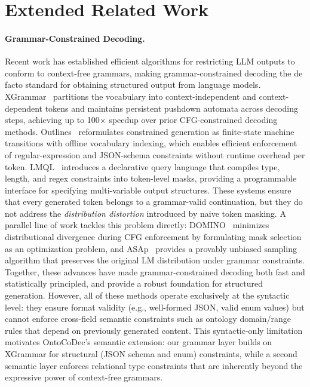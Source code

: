 \section{Extended Related Work}
\label{app:related_work}

\paragraph{Grammar-Constrained Decoding.}
Recent work has established efficient algorithms for restricting LLM outputs to conform to context-free grammars, making grammar-constrained decoding the de facto standard for obtaining structured output from language models.
XGrammar~\cite{dong2025xgrammar} partitions the vocabulary into context-independent and context-dependent tokens and maintains persistent pushdown automata across decoding steps, achieving up to 100$\times$ speedup over prior CFG-constrained decoding methods.
Outlines~\cite{willard2023outlines} reformulates constrained generation as finite-state machine transitions with offline vocabulary indexing, which enables efficient enforcement of regular-expression and JSON-schema constraints without runtime overhead per token.
LMQL~\cite{beurer-kellner2023lmql} introduces a declarative query language that compiles type, length, and regex constraints into token-level masks, providing a programmable interface for specifying multi-variable output structures.
These systems ensure that every generated token belongs to a grammar-valid continuation, but they do not address the \emph{distribution distortion} introduced by naive token masking.
A parallel line of work tackles this problem directly: DOMINO~\cite{beurer-kellner2024domino} minimizes distributional divergence during CFG enforcement by formulating mask selection as an optimization problem, and ASAp~\cite{park2024grammar} provides a provably unbiased sampling algorithm that preserves the original LM distribution under grammar constraints.
Together, these advances have made grammar-constrained decoding both fast and statistically principled, and provide a robust foundation for structured generation.
However, all of these methods operate exclusively at the syntactic level: they ensure format validity (e.g., well-formed JSON, valid enum values) but cannot enforce cross-field semantic constraints such as ontology domain/range rules that depend on previously generated content.
This syntactic-only limitation motivates OntoCoDec's semantic extension: our grammar layer builds on XGrammar for structural (JSON schema and enum) constraints, while a second semantic layer enforces relational type constraints that are inherently beyond the expressive power of context-free grammars.

